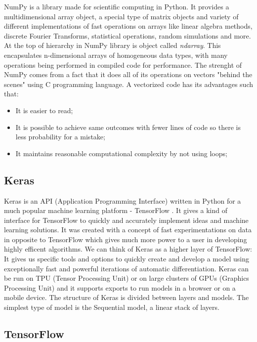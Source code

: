 \documentclass[a4paper,oneside,openright,11pt]{book}
\begin{document}
NumPy \cite{numpy} is a library made for scientific computing in Python. It provides a multidimensional array object, a special type of matrix objects and variety of different implementations of fast operations on arrays like linear algebra methods, discrete Fourier Transforms, statistical operations, random simulations and more. At the top of hierarchy in NumPy library is object called \emph{ndarray}. This encapsulates n-dimensional arrays of homogeneous data types, with many operations being performed in compiled code for performance. The strenght of NumPy comes from a fact that it does all of its operations on vectors "behind the scenes" using C programming language. A vectorized code has its advantages such that:

\begin{itemize}
    \item It is easier to read;
    \item It is
    possible to achieve same outcomes with fewer lines of code so there is less probability for a mistake;
    \item It maintains reasonable computational complexity by not using loops;
\end{itemize}


\subsection{Keras}

Keras \cite{Keras} is an API (Application Programming Interface) written in Python for a much popular machine learning platform - TensorFlow \cite{tf}. It gives a kind of interface for TensorFlow to quickly and accurately implement ideas and machine learning solutions. It was created with a concept of fast experimentations on data in opposite to TensorFlow which gives much more power to a user in developing highly efficent algorithms. We can think of Keras as a higher layer of TensorFlow: It gives us specific tools and options to quickly create and develop a model using exceptionally fast and powerful iterations of automatic differentiation. Keras can be run on TPU (Tensor Processing Unit) or on large clusters of GPUs (Graphics Processing Unit) and it supports exports to run models in a browser or on a mobile device. The structure of Keras is divided between layers and models. The simplest type of model is the Sequential model, a linear stack of layers. 

\subsection{TensorFlow}
\end{document}

